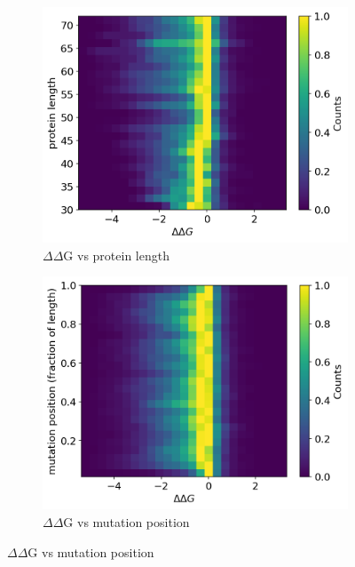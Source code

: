 \documentclass{article}
\begin{document}
\begin{figure}[!htb]
    \centering
    \begin{subfigure}[h]{0.4\textwidth}
        \centering
        \includegraphics[width=\textwidth]{plots/protein_lengths.png}
        \caption{$\Delta\Delta$G vs protein length}
        \label{fig:lengths}
    \end{subfigure}
    \hfill
    \begin{subfigure}[h]{0.4\textwidth}
        \centering
        \includegraphics[width=\textwidth]{plots/mutation_position.png}
        \caption{$\Delta\Delta$G vs mutation position}
        \label{fig:position}
    \end{subfigure}

\end{figure}
\end{document}

